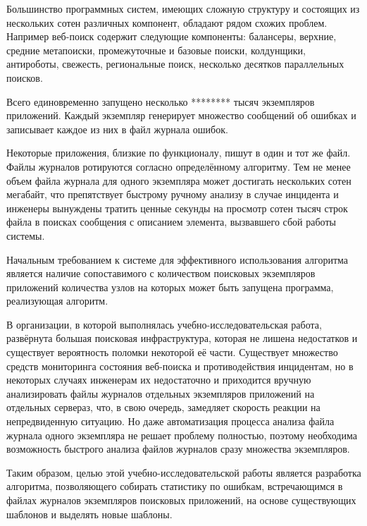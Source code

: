 Большинство программных систем, имеющих сложную структуру и состоящих из
нескольких сотен различных компонент, обладают рядом схожих проблем.
Например веб-поиск содержит следующие компоненты:
балансеры, верхние, средние метапоиски, промежуточные и базовые поиски,
колдунщики, антироботы, свежесть, региональные поиск,
несколько десятков параллельных поисков.


Всего единовременно запущено несколько ******** тысяч экземпляров приложений.
Каждый экземпляр генерирует множество сообщений об ошибках и записывает
каждое из них в файл журнала ошибок.

Некоторые приложения, близкие по функционалу, пишут в один и тот же файл.
Файлы журналов ротируются согласно определённому алгоритму. Тем не менее объем
файла журнала для одного экземпляра может достигать нескольких сотен мегабайт,
что препятствует быстрому ручному анализу в случае инцидента и инженеры
вынуждены тратить ценные секунды на просмотр сотен тысяч строк файла в поисках
сообщения с описанием элемента, вызвавшего сбой работы системы.

Начальным требованием к системе для эффективного использования алгоритма
является наличие сопоставимого с количеством поисковых экземпляров
приложений количества узлов на которых может быть запущена программа,
реализующая алгоритм.

В организации, в которой выполнялась учебно-исследовательская работа,
развёрнута большая поисковая инфраструктура, которая не лишена недостатков и
существует вероятность поломки некоторой её части. Существует множество
средств мониторинга состояния веб-поиска и противодействия инцидентам,
но в некоторых случаях инженерам их недостаточно и приходится вручную
анализировать файлы журналов отдельных экземпляров приложений на отдельных
сервераз, что, в свою очередь, замедляет скорость реакции на непредвиденную
ситуацию. Но даже автоматизация процесса анализа файла журнала одного
экземпляра не решает проблему полностью, поэтому необходима возможность
быстрого анализа файлов журналов сразу множества экземпляров.

Таким образом, целью этой учебно-исследовательской работы является разработка
алгоритма, позволяющего собирать статистику по ошибкам, встречающимся
в файлах журналов экземпляров поисковых приложений, на основе существующих
шаблонов и выделять новые шаблоны.
